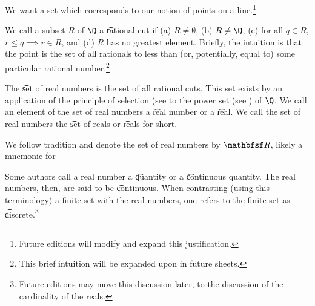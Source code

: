 

We want a set which corresponds to our notion of points on a line.\footnote{Future editions will modify and expand this justification.}


We call a subset $R$ of $\Q$ a \t{rational cut} if (a) $R \neq \emptyset$, (b) $R \neq \Q$, (c) for all $q \in R$, $r \leq q \implies r \in R$, and (d) $R$ has no greatest element.
Briefly, the intuition is that the point is the set of all rationals to less than (or, potentially, equal to) some particular rational number.\footnote{This brief intuition will be expanded upon in future sheets.}

The \t{set of real numbers} is the set of all rational cuts.
This set exists by an application of the principle of selection (see  to the power set (see ) of $\Q$.
We call an element of the set of real numbers a \t{real number} or a \t{real}.
We call the set of real numbers the \t{set of reals} or \t{reals} for short.


We follow tradition and denote the set of real numbers by $\R$, likely a mnemonic for 


Some authors call a real number a \t{quantity} or a \t{continuous quantity}.
The real numbers, then, are said to be \t{continuous}.
When contrasting (using this terminology) a finite set with the real numbers, one refers to the finite set as \t{discrete}.\footnote{Future editions may move this discussion later, to the discussion of the cardinality of the reals.}

